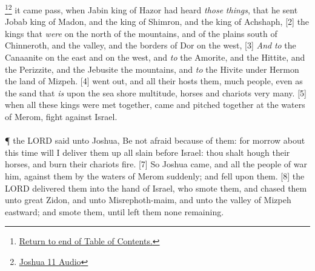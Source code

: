 \footnote{\textcolor[rgb]{0.00,0.25,0.00}{\hyperlink{TOC}{Return to end of Table of Contents.}}}\footnote{\href{https://audiobible.com/bible/joshua_11.html}{\textcolor[cmyk]{0.99998,1,0,0}{Joshua 11 Audio}}}\textcolor[cmyk]{0.99998,1,0,0}{ it came  pass, when Jabin king of Hazor had heard \emph{those} \emph{things}, that he sent  Jobab king of Madon, and  the king of Shimron, and  the king of Achshaph,}
[2] \textcolor[cmyk]{0.99998,1,0,0}{  the kings that \emph{were} on the north of the mountains, and of the plains south of Chinneroth, and  the valley, and  the borders of Dor on the west,}
[3] \textcolor[cmyk]{0.99998,1,0,0}{\emph{And} \emph{to} the Canaanite on the east and on the west, and \emph{to} the Amorite, and the Hittite, and the Perizzite, and the Jebusite  the mountains, and \emph{to} the Hivite under Hermon  the land of Mizpeh.}
[4] \textcolor[cmyk]{0.99998,1,0,0}{  went out,  and all their hosts  them, much people, even as the sand that \emph{is} upon the sea shore  multitude,  horses and chariots very many.}
[5] \textcolor[cmyk]{0.99998,1,0,0}{ when all these kings were met together,  came and pitched together at the waters of Merom,  fight against Israel.}\\
\\
\P \textcolor[cmyk]{0.99998,1,0,0}{ the LORD said unto Joshua, Be not afraid because of them: for  morrow about this time will I deliver them up all slain before Israel: thou shalt hough their horses, and burn their chariots  fire.}
[7] \textcolor[cmyk]{0.99998,1,0,0}{So Joshua came, and all the people of war  him, against them by the waters of Merom suddenly; and  fell upon them.}
[8] \textcolor[cmyk]{0.99998,1,0,0}{ the LORD delivered them into the hand of Israel, who smote them, and chased them unto great Zidon, and unto Misrephoth-maim, and unto the valley of Mizpeh eastward; and  smote them, until  left them none remaining.}

